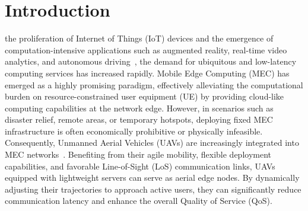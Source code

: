 \documentclass[journal]{IEEEtran}
\begin{document}
%
\IEEEpeerreviewmaketitle



\section{Introduction}
% 
% 
% 
% 
 the proliferation of Internet of Things (IoT) devices and the emergence of computation-intensive applications such as augmented reality, real-time video analytics, and autonomous driving~\cite{wang2023wpmec_survey, 
ning2025joint_data}, the demand for ubiquitous and low-latency computing services has increased rapidly. Mobile Edge Computing (MEC) has emerged as a highly promising paradigm, effectively alleviating the computational burden on resource-constrained user equipment (UE) by providing cloud-like computing capabilities at the network edge. However, in scenarios such as disaster relief, remote areas, or temporary hotspots, deploying fixed MEC infrastructure is often economically prohibitive or physically infeasible. Consequently, Unmanned Aerial Vehicles (UAVs) are increasingly integrated into MEC networks~\cite{zeng2019energy,wu2018joint, hao2024joint_tmc}. Benefiting from their agile mobility, flexible deployment capabilities, and favorable Line-of-Sight (LoS) communication links, UAVs equipped with lightweight servers can serve as aerial edge nodes. By dynamically adjusting their trajectories to approach active users, they can significantly reduce communication latency and enhance the overall Quality of Service (QoS).
\end{document}
